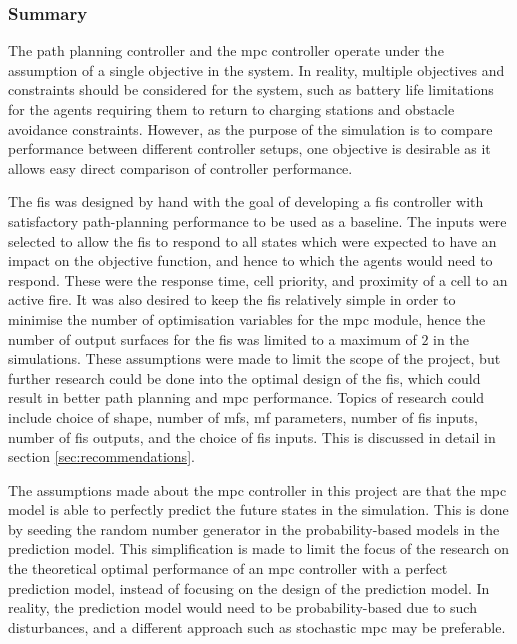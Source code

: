 \documentclass[conference]{IEEEtran}
\begin{document}
\subsubsection{Summary}
The path planning controller and the \gls{mpc} controller operate under the assumption of a single objective in the system.
In reality, multiple objectives and constraints should be considered for the system, such as battery life limitations for the agents requiring them to return to charging stations and obstacle avoidance constraints.
However, as the purpose of the simulation is to compare performance between different controller setups, one objective is desirable as it allows easy direct comparison of controller performance.

The \gls{fis} was designed by hand with the goal of developing a \gls{fis} controller with satisfactory path-planning performance to be used as a baseline.
The inputs were selected to allow the \gls{fis} to respond to all states which were expected to have an impact on the objective function, and hence to which the agents would need to respond.
These were the response time, cell priority, and proximity of a cell to an active fire.
It was also desired to keep the \gls{fis} relatively simple in order to minimise the number of optimisation variables for the \gls{mpc} module, hence the number of output surfaces for the \gls{fis} was limited to a maximum of $2$ in the simulations.
These assumptions were made to limit the scope of the project, but further research could be done into the optimal design of the \gls{fis}, which could result in better path planning and \gls{mpc} performance.
Topics of research could include choice of \mf shape, number of \gls{mf}s, \gls{mf} parameters, number of \gls{fis} inputs, number of \gls{fis} outputs, and the choice of \gls{fis} inputs.
This is discussed in detail in section \ref{sec:recommendations}.


The assumptions made about the \gls{mpc} controller in this project are that the \gls{mpc} model is able to perfectly predict the future states in the simulation.
This is done by seeding the random number generator in the probability-based models in the prediction model. 
This simplification is made to limit the focus of the research on the theoretical optimal performance of an \gls{mpc} controller with a perfect prediction model, instead of focusing on the design of the prediction model.
In reality, the prediction model would need to be probability-based due to such disturbances, and a different approach such as stochastic \gls{mpc} may be preferable.
\end{document}
